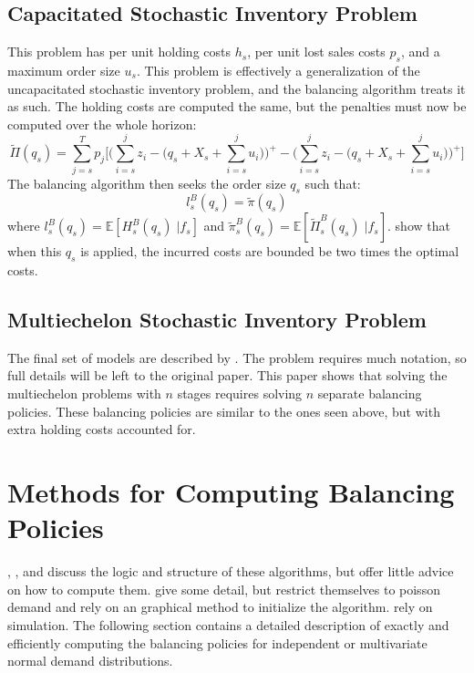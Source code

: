 \documentclass[12pt]{article}
\newcommand{\EX}{\mathbb{E}}
\begin{document}
\subsection{Capacitated Stochastic Inventory Problem}

This problem has per unit holding costs $h_s$, per unit lost sales costs $p_s$, and a maximum order size $u_s$. This problem is effectively a generalization of the uncapacitated stochastic inventory problem, and the balancing algorithm treats it as such. The holding costs are computed the same, but the penalties must now be computed over the whole horizon:
$$
	\tilde{\Pi}(q_s) = \sum_{j=s}^T p_j \big[\big(\sum_{i=s}^j z_i - (q_s + X_s + \sum_{i=s}^j u_i\big)\big)^+ - \big(\sum_{i=s}^j z_i - (q_s + X_s + \sum_{i=s}^j u_i\big)\big)^+\big]
$$
The balancing algorithm then seeks the order size $q_s$ such that:
$$
	l_s^B(q_s) = \tilde{\pi}(q_s)
$$
where $l_s^B(q_s) = \EX[H_s^B(q_s) \; | f_s]$ and $\tilde{\pi}_s^B(q_s) = \EX[\tilde{\Pi}_s^B(q_s) \; | f_s]$. \cite{levi:2008} show that when this $q_s$ is applied, the incurred costs are bounded be two times the optimal costs.

\subsection{Multiechelon Stochastic Inventory Problem}

The final set of models are described by \cite{levi:2016}. The problem requires much notation, so full details will be left to the original paper. This paper shows that solving the multiechelon problems with $n$ stages requires solving $n$ separate balancing policies. These balancing policies are similar to the ones seen above, but with extra holding costs accounted for. 

\section{Methods for Computing Balancing Policies}

\cite{levi:2007}, \cite{levi:2008}, and \cite{levi:2016} discuss the logic and structure of these algorithms, but offer little advice on how to compute them. \cite{yu:2010} give some detail, but restrict themselves to poisson demand and rely on an graphical method to initialize the algorithm. \cite{hurley:2007} rely on simulation. The following section contains a detailed description of exactly and efficiently computing the balancing policies for independent or multivariate normal demand distributions. 
\end{document}
